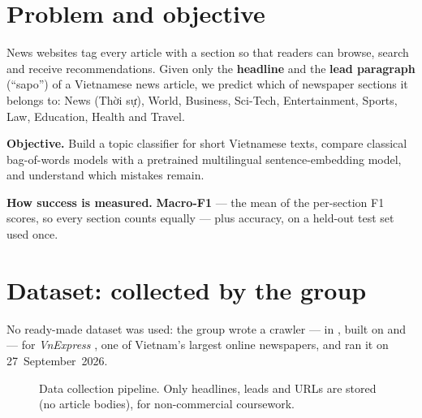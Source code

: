 
\section{Problem and objective}\label{tx:problem}
News websites tag every article with a section so that readers can browse, search and receive recommendations.
Given only the \textbf{headline} and the \textbf{lead paragraph} (``sapo'') of a Vietnamese news article, we predict which of
\TXClasses{} newspaper sections it belongs to: News (Thời sự), World, Business, Sci-Tech, Entertainment, Sports, Law,
Education, Health and Travel.

\textbf{Objective.} Build a topic classifier for short Vietnamese texts, compare classical bag-of-words models with a
pretrained multilingual sentence-embedding model, and understand which mistakes remain.

\textbf{How success is measured.} \textbf{Macro-F1} — the mean of the per-section F1 scores, so every section counts
equally — plus accuracy, on a held-out test set used once.

\section{Dataset: collected by the group}\label{tx:dataset}
No ready-made dataset was used: the group wrote a crawler —  in , built on
 and  — for \emph{VnExpress} \cite{tx-vnexpress}, one of Vietnam's largest online newspapers, and ran it on
27~September~2026.

\begin{figure}[H]\centering
{}
\caption{Data collection pipeline. Only headlines, leads and URLs are stored (no article bodies), for non-commercial coursework.\label{tx:fig-pipeline}}
\end{figure}

